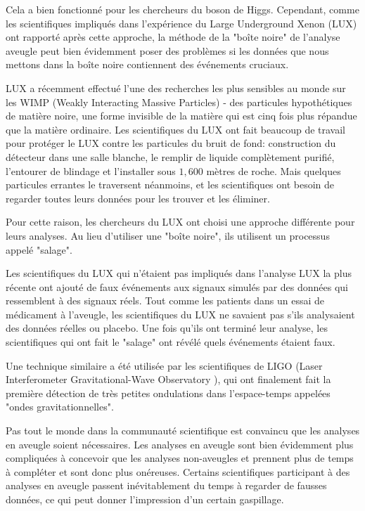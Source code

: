 	Cela a bien fonctionn\'e pour les chercheurs du boson de Higgs. Cependant, comme les scientifiques impliqu\'es dans l'exp\'erience du Large Underground Xenon (LUX) ont rapport\'e après cette approche, la m\'ethode de la "boîte noire" de l'analyse aveugle peut bien \'evidemment poser des problèmes si les donn\'ees que nous mettons dans la boîte noire contiennent des \'ev\'enements cruciaux.
	
	LUX a r\'ecemment effectu\'e l'une des recherches les plus sensibles au monde sur les WIMP (Weakly Interacting Massive Particles) - des particules hypoth\'etiques de matière noire, une forme invisible de la matière qui est cinq fois plus r\'epandue que la matière ordinaire. Les scientifiques du LUX ont fait beaucoup de travail pour prot\'eger le LUX contre les particules du bruit de fond: construction du d\'etecteur dans une salle blanche, le remplir de liquide complètement purifi\'e, l'entourer de blindage et l'installer sous $1,600$ mètres de roche. Mais quelques particules errantes le traversent n\'eanmoins, et les scientifiques ont besoin de regarder toutes leurs donn\'ees pour les trouver et les \'eliminer.

	Pour cette raison, les chercheurs du LUX ont choisi une approche diff\'erente pour leurs analyses. Au lieu d'utiliser une "boîte noire", ils utilisent un processus appel\'e "salage".

	Les scientifiques du LUX qui n'\'etaient pas impliqu\'es dans l'analyse LUX la plus r\'ecente ont ajout\'e de faux \'ev\'enements aux signaux simul\'es par des donn\'ees qui ressemblent à des signaux r\'eels. Tout comme les patients dans un essai de m\'edicament à l'aveugle, les scientifiques du LUX ne savaient pas s'ils analysaient des donn\'ees r\'eelles ou placebo. Une fois qu'ils ont termin\'e leur analyse, les scientifiques qui ont fait le "salage" ont r\'ev\'el\'e quels \'ev\'enements \'etaient faux.

	Une technique similaire a \'et\'e utilis\'ee par les scientifiques de LIGO (Laser Interferometer Gravitational-Wave Observatory ), qui ont finalement fait la première d\'etection de très petites ondulations dans l'espace-temps appel\'ees "ondes gravitationnelles".

	Pas tout le monde dans la communaut\'e scientifique est convaincu que les analyses en aveugle soient n\'ecessaires. Les analyses en aveugle sont bien \'evidemment plus compliqu\'ees à concevoir que les analyses non-aveugles et prennent plus de temps à compl\'eter et sont donc plus on\'ereuses. Certains scientifiques participant à des analyses en aveugle passent in\'evitablement du temps à regarder de fausses donn\'ees, ce qui peut donner l'impression d'un certain gaspillage.
	
